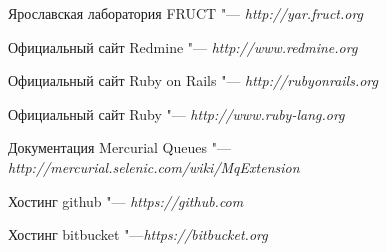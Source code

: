 \begin{thebibliography}{99}

Ярославская лаборатория FRUCT "--- \textit{http://yar.fruct.org}

Официальный сайт Redmine "--- \textit{http://www.redmine.org}

Официальный сайт Ruby on Rails "--- \textit{http://rubyonrails.org}

Официальный сайт Ruby "--- \textit{http://www.ruby-lang.org}

Документация Mercurial
Queues "--- \textit{http://mercurial.selenic.com/wiki/MqExtension}

Хостинг github "--- \textit{https://github.com}

Хостинг bitbucket "---\textit{https://bitbucket.org}

\end{thebibliography}
